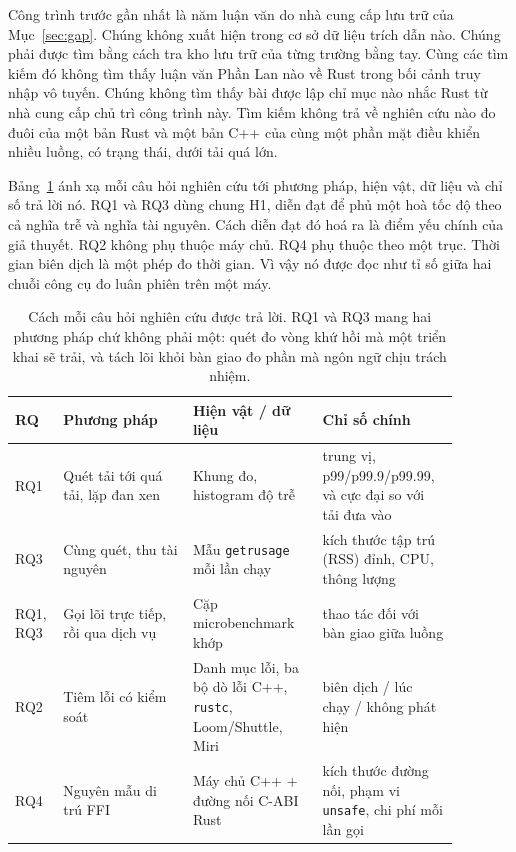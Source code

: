 Công trình trước gần nhất là năm luận văn do nhà cung cấp lưu trữ của
Mục~\ref{sec:gap}. Chúng không xuất hiện trong cơ sở dữ liệu trích dẫn nào. Chúng phải được tìm
bằng cách tra kho lưu trữ của từng trường bằng tay. Cùng các tìm kiếm đó không tìm thấy luận
văn Phần Lan nào về Rust trong bối cảnh truy nhập vô tuyến. Chúng không tìm thấy bài được lập
chỉ mục nào nhắc Rust từ nhà cung cấp chủ trì công trình này. Tìm kiếm không trả về nghiên cứu
nào đo đuôi của một bản Rust và một bản C++ của cùng một phần mặt điều khiển nhiều luồng, có
trạng thái, dưới tải quá lớn.

Bảng~\ref{tab:design} ánh xạ mỗi câu hỏi nghiên cứu tới phương pháp, hiện vật, dữ liệu và chỉ
số trả lời nó. RQ1 và RQ3 dùng chung H1, diễn đạt để phủ một hoà tốc độ theo cả nghĩa trễ và
nghĩa tài nguyên. Cách diễn đạt đó hoá ra là điểm yếu chính của giả thuyết. RQ2 không phụ thuộc
máy chủ. RQ4 phụ thuộc theo một trục. Thời gian biên dịch là một phép đo thời gian. Vì vậy nó
được đọc như tỉ số giữa hai chuỗi công cụ đo luân phiên trên một máy.

\begin{table}[ht]
\centering
\small
\caption[Cách mỗi câu hỏi nghiên cứu được trả lời]{Cách mỗi câu hỏi nghiên cứu được trả lời.
RQ1 và RQ3 mang hai phương pháp chứ không phải một: quét đo vòng khứ hồi mà một triển khai sẽ
trải, và tách lõi khỏi bàn giao đo phần mà ngôn ngữ chịu trách nhiệm.
\label{tab:design}}
\renewcommand{\arraystretch}{1.2}
\setlength{\tabcolsep}{4pt}
\begin{tabular}{@{}p{0.07\linewidth} p{0.27\linewidth} p{0.27\linewidth} p{0.27\linewidth}@{}}
\hline\hline
RQ & Phương pháp & Hiện vật / dữ liệu & Chỉ số chính \\
\hline
RQ1 & Quét tải tới quá tải, lặp đan xen & Khung đo, histogram độ trễ &
trung vị, p99/p99.9/p99.99, và cực đại so với tải đưa vào \\
RQ3 & Cùng quét, thu tài nguyên & Mẫu \texttt{getrusage} mỗi lần chạy &
kích thước tập trú (RSS) đỉnh, CPU, thông lượng \\
RQ1, RQ3 & Gọi lõi trực tiếp, rồi qua dịch vụ &
Cặp microbenchmark khớp &
thao tác đối với bàn giao giữa luồng \\
RQ2 & Tiêm lỗi có kiểm soát & Danh mục lỗi, ba bộ dò lỗi C++,
\texttt{rustc}, Loom/Shuttle, Miri &
biên dịch / lúc chạy / không phát hiện \\
RQ4 & Nguyên mẫu di trú FFI & Máy chủ C++ $+$ đường nối C-ABI Rust &
kích thước đường nối, phạm vi \texttt{unsafe}, chi phí mỗi lần gọi \\
\hline
\end{tabular}
\end{table}

